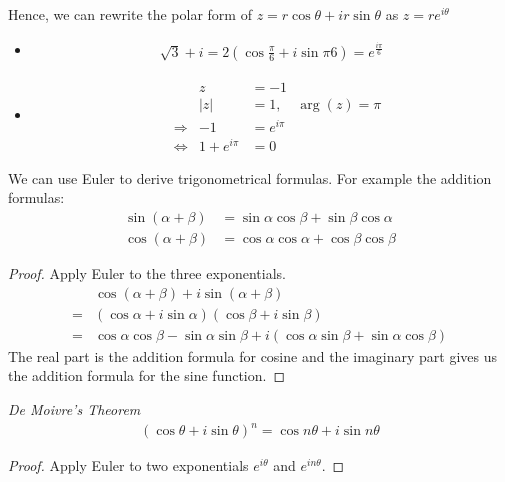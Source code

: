 Hence, we can rewrite the polar form of $z = r \cos \theta + i r \sin \theta$ as $z = r e^{i \theta}$

\begin{ex}
	\begin{itemize}
		\item
	\begin{align*}
	\sqrt 3 + i = 2\left( \cos \frac \pi 6 + i \sin \pi 6 \right) = e^{\frac{i \pi} 6}
	\end{align*}
	\item
	\begin{align*}
	& &	z & = -1 \\
	& &	 |z| & = 1, \quad \arg(z) = \pi \\
		& \Rightarrow & -1 & = e^{i\pi}  \\
	& \Leftrightarrow &	1 + e^{i\pi} & = 0
	\end{align*}
\end{itemize}
\end{ex}


We can use Euler to derive trigonometrical formulas. For example the addition formulas:
\begin{align*}
\sin( \alpha + \beta) & = \sin \alpha \cos \beta  + \sin \beta \cos \alpha \\
\cos( \alpha + \beta) & = \cos \alpha \cos \alpha  + \cos \beta \cos \beta
\end{align*}
\begin{proof}
	Apply Euler to the three exponentials.
	\begin{align*}
	& \cos(\alpha+ \beta)  + i \sin (\alpha+ \beta) \\
	= & (\cos \alpha + i \sin \alpha) (\cos \beta + i \sin \beta) \\
	= & \cos \alpha \cos \beta - \sin \alpha \sin \beta + i( \cos \alpha \sin \beta + \sin \alpha \cos \beta)
	\end{align*}
	The real part is the addition formula for cosine and the imaginary part gives us the addition formula for the sine function.
\end{proof}

\begin{tm}
\emph{De Moivre's Theorem} 
\begin{align*}
(\cos \theta + i \sin \theta )^n = \cos n \theta + i \sin n \theta
\end{align*}
\end{tm}

\begin{proof}
	Apply Euler to two exponentials $e^{i \theta}$ and $e^{in \theta}$.
\end{proof}

